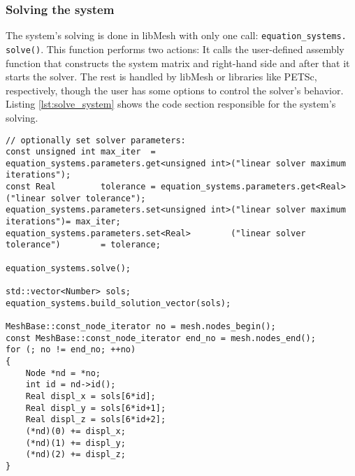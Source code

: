   \subsubsection{Solving the system}\label{sec:Impl-Details-Solving}
  The system's solving is done in libMesh with only one call:
  \texttt{equation\_systems.\,\!solve()}. This function performs two actions: It calls the user-defined assembly function that constructs the system matrix and right-hand side and after that it starts the solver. The rest is handled by libMesh or libraries like PETSc, respectively, though the user has some options to control the solver's behavior. Listing \ref{lst:solve_system} shows the code section responsible for the system's solving.
\begin{lstlisting}[caption=Solve the system and build solution,label=lst:solve_system,keepspaces=true]
// optionally set solver parameters:
const unsigned int max_iter  = equation_systems.parameters.get<unsigned int>("linear solver maximum iterations");
const Real         tolerance = equation_systems.parameters.get<Real>("linear solver tolerance");
equation_systems.parameters.set<unsigned int>("linear solver maximum iterations")= max_iter;
equation_systems.parameters.set<Real>        ("linear solver tolerance")        = tolerance;

equation_systems.solve();

std::vector<Number> sols;
equation_systems.build_solution_vector(sols);

MeshBase::const_node_iterator no = mesh.nodes_begin();
const MeshBase::const_node_iterator end_no = mesh.nodes_end();
for (; no != end_no; ++no)
{
	Node *nd = *no;
	int id = nd->id();
	Real displ_x = sols[6*id];
	Real displ_y = sols[6*id+1];
	Real displ_z = sols[6*id+2];
	(*nd)(0) += displ_x;
	(*nd)(1) += displ_y;
	(*nd)(2) += displ_z;
}
\end{lstlisting}
